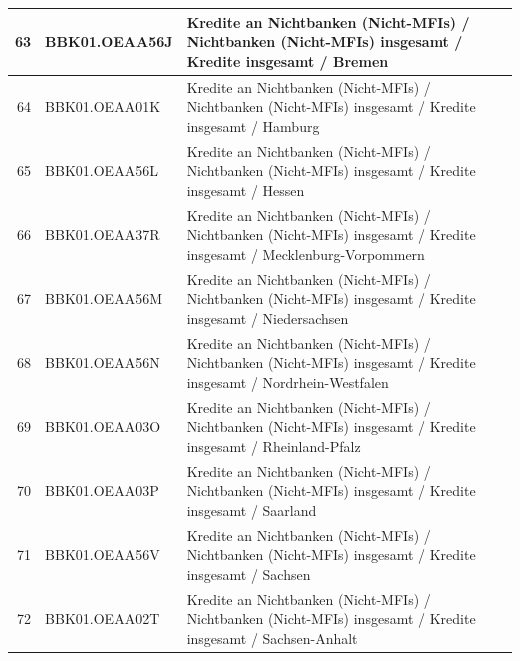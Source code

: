 \documentclass[11pt]{article}
\begin{document}
\begin{table}
\begin{tabular}{rp{5cm}p{11cm}}
  \hline
  63 & BBK01.OEAA56J & Kredite an Nichtbanken (Nicht-MFIs) / Nichtbanken (Nicht-MFIs) insgesamt / Kredite insgesamt / Bremen \\ 
  \hline
  64 & BBK01.OEAA01K & Kredite an Nichtbanken (Nicht-MFIs) / Nichtbanken (Nicht-MFIs) insgesamt / Kredite insgesamt / Hamburg \\ 
  \hline
  65 & BBK01.OEAA56L & Kredite an Nichtbanken (Nicht-MFIs) / Nichtbanken (Nicht-MFIs) insgesamt / Kredite insgesamt / Hessen \\ 
  \hline
  66 & BBK01.OEAA37R & Kredite an Nichtbanken (Nicht-MFIs) / Nichtbanken (Nicht-MFIs) insgesamt / Kredite insgesamt / Mecklenburg-Vorpommern \\ 
  \hline
  67 & BBK01.OEAA56M & Kredite an Nichtbanken (Nicht-MFIs) / Nichtbanken (Nicht-MFIs) insgesamt / Kredite insgesamt / Niedersachsen \\ 
  \hline
  68 & BBK01.OEAA56N & Kredite an Nichtbanken (Nicht-MFIs) / Nichtbanken (Nicht-MFIs) insgesamt / Kredite insgesamt / Nordrhein-Westfalen \\ 
  \hline
  69 & BBK01.OEAA03O & Kredite an Nichtbanken (Nicht-MFIs) / Nichtbanken (Nicht-MFIs) insgesamt / Kredite insgesamt / Rheinland-Pfalz \\ 
  \hline
  70 & BBK01.OEAA03P & Kredite an Nichtbanken (Nicht-MFIs) / Nichtbanken (Nicht-MFIs) insgesamt / Kredite insgesamt / Saarland \\ 
  \hline
  71 & BBK01.OEAA56V & Kredite an Nichtbanken (Nicht-MFIs) / Nichtbanken (Nicht-MFIs) insgesamt / Kredite insgesamt / Sachsen \\ 
  \hline
  72 & BBK01.OEAA02T & Kredite an Nichtbanken (Nicht-MFIs) / Nichtbanken (Nicht-MFIs) insgesamt / Kredite insgesamt / Sachsen-Anhalt \\ 

 \end{tabular}
\end{table}
\end{document}
